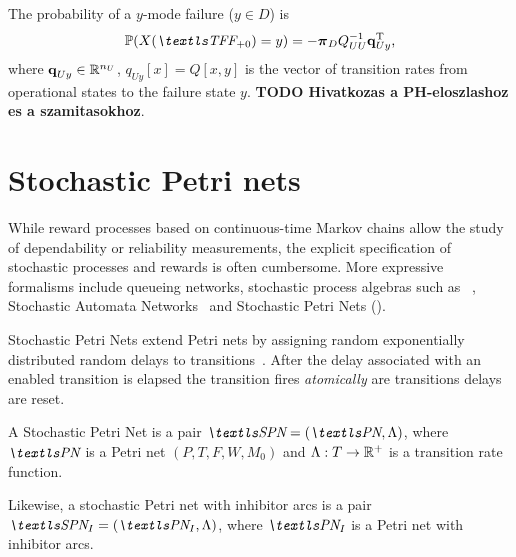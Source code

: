 The probability of a $y$-mode failure ($y \in D$) is
\begin{equation}
  \Pr(X(\TFF_{+ 0}) = y) = - \vec{\pi}_D Q_{UU}^{-1} \vec{q}_{Uy}^\T \text,
\end{equation}
where $\bm{\mathrm{q}}_{Uy} \in \mathbb{R}^{n_U}$, $q_{Uy}[x] = Q[x, y]$ is the
vector of transition rates from operational states to the failure
state $y$. \textbf{TODO Hivatkozas a PH-eloszlashoz es a
  szamitasokhoz}.

\section{Stochastic Petri nets}

While reward processes based on continuous-time Markov chains allow
the study of dependability or reliability measurements, the explicit
specification of stochastic processes and rewards is often
cumbersome. More expressive formalisms include queueing networks,
stochastic process algebras such as
~\citep{DBLP:conf/cpe/GilmoreH94,donatelli1993superposed},
Stochastic Automata Networks~\citep{DBLP:conf/mascots/FernandesPS95}
and Stochastic Petri Nets ().

Stochastic Petri Nets extend Petri nets by assigning random
exponentially distributed random delays to
transitions~\citep{DBLP:conf/apn/Marsan88}. After the delay associated
with an enabled transition is elapsed the transition fires
\emph{atomically} are transitions delays are reset.

\begin{dfn}
  A Stochastic Petri Net is a pair $\SPN = (\PN, \Lambda)$, where
  $\PN$ is a Petri net $(P, T, F, W, M_0)$ and $\Lambda: T \to \mathbb{R}^{+}$
  is a transition rate function.

  Likewise, a stochastic Petri net with inhibitor arcs is a pair
  $\SPN_I = (\PN_I, \Lambda)$, where $\PN_I$ is a Petri net with
  inhibitor arcs.
\end{dfn}

\needspace{5ex}


